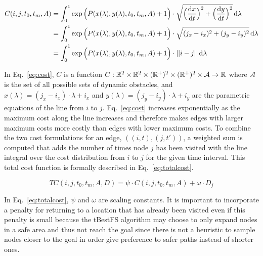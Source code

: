 
\begin{align}
    C(i, j, t_0, t_m, A) &= \int^1_0 \exp{\Big(
        P(x(\lambda), y(\lambda), t_0, t_m, A) + 1 \Big)
    } \cdot \sqrt{\Big(\frac{{\mathrm{d}} x}{{\mathrm{d}} t}\Big)^2
    + \Big(\frac{{\mathrm{d}} y}{{\mathrm{d}} t}\Big)^2}
    \,\mathrm{d}\lambda \notag \\
    &= \int^1_0 \exp{\Big(
        P(x(\lambda), y(\lambda), t_0, t_m, A) + 1 \Big)
    } \cdot \sqrt{(j_x - i_x)^2 + (j_y - i_y)^2}
    \,\mathrm{d}\lambda \notag \\
    &= \int^1_0 \exp{\Big(
        P(x(\lambda), y(\lambda), t_0, t_m, A) + 1 \Big)
    } \cdot ||i - j|| \,\mathrm{d}\lambda
    \label{eq:cost}
\end{align}

In Eq.~\ref{eq:cost}, $C$ is a function $C: \mathbb{R}^2 \times \mathbb{R}^2 \times (\mathbb{R}^+)^2
\times (\mathbb{R}^+)^2 \times \mathcal{A} \rightarrow \mathbb{R}$ where $\mathcal{A}$ is the
set of all possible sets of dynamic obstacles, and $x(\lambda) = (j_x - i_x)
\cdot \lambda + i_x$ and $y(\lambda) = (j_y - i_y) \cdot \lambda + i_y$ are the
parametric equations of the line from $i$ to $j$.  Eq.~\ref{eq:cost} increases
exponentially as the maximum cost along the line increases and therefore makes
edges with larger maximum costs more costly than edges with lower maximum
costs. To combine the two cost formulations for an edge, $((i, t), (j, t'))$, a
weighted sum is computed that adds the number of times node $j$ has been
visited with the line integral over the cost distribution from $i$ to $j$ for
the given time interval. This total cost function is formally described in
Eq.~\ref{eq:totalcost}.

\begin{equation}
    TC(i, j, t_0, t_m, A, D) = \psi \cdot C(i, j, t_0, t_m, A) +
    \omega \cdot D_j
    \label{eq:totalcost}
\end{equation}

In Eq.~\ref{eq:totalcost}, $\psi$ and $\omega$ are scaling constants. It is
important to incorporate a penalty for returning to a location that has already
been visited even if this penalty is small because the tBestFS algorithm may
choose to only expand nodes in a safe area and thus not reach the goal since
there is not a heuristic to sample nodes closer to the goal in order give
preference to safer paths instead of shorter ones.


